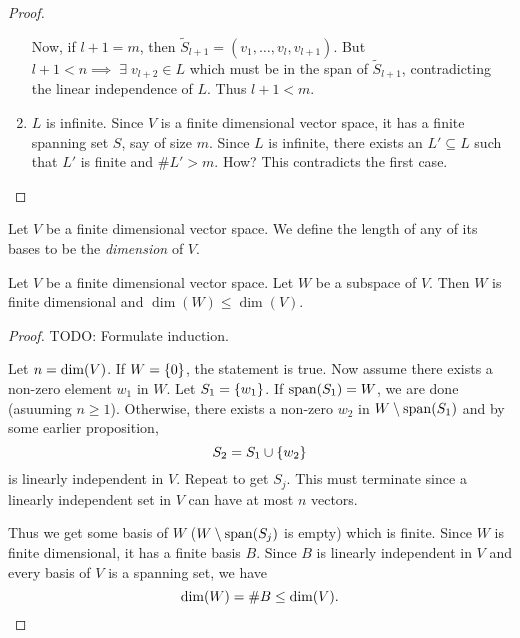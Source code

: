 \begin{proof}
\begin{enumerate}[label=(Case \arabic*)]
        Now, if $l + 1 = m$, then $\tilde{S}_{l + 1} = (v_{1}, \dots, v_{l}, v_{l + 1})$.
        But $l + 1 < n \implies \;\exists\; v_{l + 2} \in L$ which must be in the span of $\tilde{S}_{l + 1}$, contradicting the linear independence of $L$.
        Thus $l + 1 < m$.

        \item $L$ is infinite.
        Since $V$ is a finite dimensional vector space, it has a finite spanning set $S$, say of size $m$.
        Since $L$ is infinite, there exists an $L' \subseteq L$ such that $L'$ is finite and $\#L' > m$. \textcolor{red!70!black}{How?}
        This contradicts the first case. \qedhere
    \end{enumerate}
\end{proof}

\begin{defn}[Dimension] \label{defn:dimension}
    Let $V$ be a finite dimensional vector space.
    We define the length of any of its bases to be the \emph{dimension} of $V$.
\end{defn}

\begin{prop}[]
    Let $V$ be a finite dimensional vector space.
    Let $W$ be a subspace of $V$.
    Then $W$ is finite dimensional and $\dim(W) \leq \dim(V)$.
\end{prop}
\begin{proof}
    \textcolor{red!70!black}{TODO: Formulate induction}.

    Let $n = \operatorname{dim}(V)$.
    If $W = \set{0}$, the statement is true.
    Now assume there exists a non-zero element $w_{1}$ in $W$.
    Let $S_{1} = \set{w_{1}}$.
    If $\operatorname{span}(S_{1}) = W$, we are done (asuuming $n \geq 1$).
    Otherwise, there exists a non-zero $w_{2}$ in $W \setminus \operatorname{span}(S_{1})$ and by some earlier proposition, \[
        S_{2} = S_{1} \cup \set{w_{2}}
    \] is linearly independent in $V$.
    Repeat to get $S_{j}$.
    This must terminate since a linearly independent set in $V$ can have at most $n$ vectors.

    Thus we get some basis of $W$ ($W \setminus \operatorname{span}(S_{j})$ is empty) which is finite.
    Since $W$ is finite dimensional, it has a finite basis $B$.
    Since $B$ is linearly independent in $V$ and every basis of $V$ is a spanning set, we have \[
        \operatorname{dim}(W) = \#B \leq \operatorname{dim}(V). \qedhere
    \]
\end{proof}

